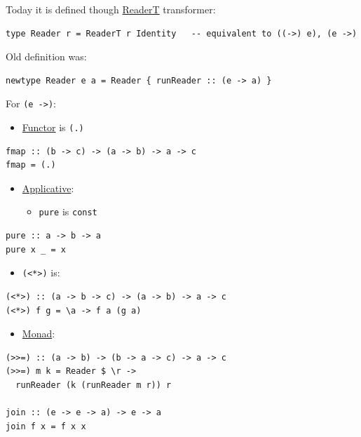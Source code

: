 \documentclass[a4paper,14pt,oneside]{book}
\begin{document}
Today it is defined though \hyperref[orga5a39c8]{ReaderT} transformer:\\
\begin{verbatim}
type Reader r = ReaderT r Identity   -- equivalent to ((->) e), (e ->)
\end{verbatim}

Old definition was:\\
\begin{verbatim}
newtype Reader e a = Reader { runReader :: (e -> a) }
\end{verbatim}

For \texttt{(e ->)}:\\
\begin{itemize}
\item \hyperref[orgd7350b0]{Functor} is \texttt{(.)}\\
\end{itemize}
\begin{verbatim}
fmap :: (b -> c) -> (a -> b) -> a -> c
fmap = (.)
\end{verbatim}
\begin{itemize}
\item \hyperref[org9f3bcb2]{Applicative}:\\
\begin{itemize}
\item \texttt{pure} is \texttt{const}\\
\end{itemize}
\end{itemize}
\begin{verbatim}
pure :: a -> b -> a
pure x _ = x
\end{verbatim}
\begin{itemize}
\item \texttt{(<*>)} is:\\
\end{itemize}
\begin{verbatim}
(<*>) :: (a -> b -> c) -> (a -> b) -> a -> c
(<*>) f g = \a -> f a (g a)
\end{verbatim}

\begin{itemize}
\item \hyperref[org27993ff]{Monad}:\\
\end{itemize}
\begin{verbatim}
(>>=) :: (a -> b) -> (b -> a -> c) -> a -> c
(>>=) m k = Reader $ \r ->
  runReader (k (runReader m r)) r

join :: (e -> e -> a) -> e -> a
join f x = f x x
\end{verbatim}
\end{document}
